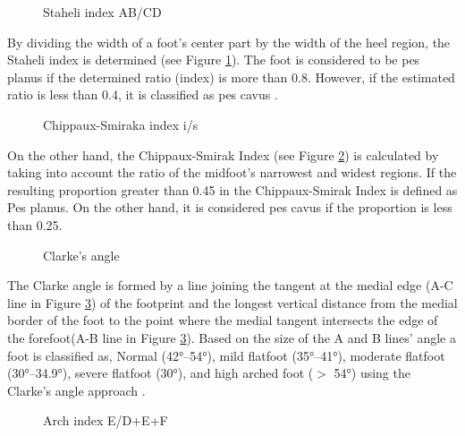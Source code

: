 \begin{figure}[htbp]
\centering
{}
\caption{Staheli index AB/CD \cite{radiopaediamearysangle}}
\label{fig:MethodologyStaheliIndex}
\end{figure}

By dividing the width of a foot's center part by the width of the heel region, the Staheli index is determined (see Figure \ref{fig:MethodologyStaheliIndex}). The foot is considered to be pes planus if the determined ratio (index) is more than 0.8. However, if the estimated ratio is less than 0.4, it is classified as pes cavus \cite{almaawi2019flatfoot}.

\begin{figure}[htbp]
\centering
{}
\caption{Chippaux-Smiraka index i/s \cite{radiopaediamearysangle}}
\label{fig:MethodologyChippauxSmirakaIndex}
\end{figure}

On the other hand, the Chippaux-Smirak Index (see Figure \ref{fig:MethodologyChippauxSmirakaIndex}) is calculated by taking into account the ratio of the midfoot's narrowest and widest regions. If the  resulting proportion greater than 0.45 in the Chippaux-Smirak Index is defined as Pes planus. On the other hand, it is considered pes cavus\cite{almaawi2019flatfoot} if the proportion is less than 0.25.

\begin{figure}[htbp]
\centering
{}
\caption{Clarke's angle \cite{ozer2012evaluation}}
\label{fig:MethodologyClarkesAngle}
\end{figure}

The Clarke angle is formed by a line joining the tangent at the medial edge (A-C line in Figure \ref{fig:MethodologyClarkesAngle}) of the footprint and the longest vertical distance from the medial border of the foot to the point where the medial tangent intersects the edge of the forefoot(A-B line in Figure \ref{fig:MethodologyClarkesAngle}). Based on the size of the A and B lines’ angle a foot is classified as, Normal (42°–54°), mild flatfoot (35°–41°), moderate flatfoot (30°–34.9°), severe flatfoot (30°), and high arched foot ($>$ 54°) using the Clarke's angle approach \cite{hegazy2021comparing}.

\begin{figure}[htbp]
\centering
{}
\caption{Arch index E/D+E+F \cite{ozer2012evaluation}}
\label{fig:MethodologyArchIndex}
\end{figure}

